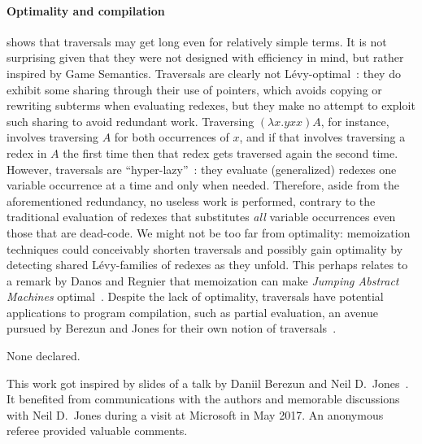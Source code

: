 \documentclass[xchauthor,chkrefs,GCNS,amsmath,amsthm,rotating,leaveRGB]{tcsg}
\theoremstyle{plain}
\theoremstyle{definition}
\begin{document}
\paragraph*{Optimality and compilation}
 shows that traversals may get long
even for relatively simple terms. It is not surprising given that they were
not designed with efficiency in mind, but rather inspired by Game Semantics.
Traversals are clearly not L\'{e}vy-optimal~\cite{optimal-reduction-levy}: they
do exhibit some sharing through their use of pointers, which avoids copying
or rewriting subterms when evaluating redexes, but they make no attempt to
exploit such sharing to avoid redundant work. Traversing $(\lambda x. y x x)
A$, for instance, involves traversing $A$ for both occurrences of $x$, and if
that involves traversing a redex in $A$ the first time then that redex gets
traversed again the second time. However, traversals are
``hyper-lazy''~\cite{danosherbelinregnier1996}: they evaluate (generalized)
redexes one variable occurrence at a time and only when needed. Therefore, aside from
the aforementioned  redundancy, no useless work is performed, contrary to
the traditional evaluation of redexes that substitutes \emph{all} variable
occurrences even those that are dead-code. We might not be too far from
optimality: memoization techniques could conceivably shorten traversals and
possibly gain optimality by detecting shared L\'{e}vy-families of redexes as
they unfold. This perhaps relates to a remark by Danos and Regnier that
memoization can make \emph{Jumping Abstract Machines}
optimal~\cite{DANOS199979}. Despite the lack of optimality, traversals have
potential applications to program compilation, such as partial evaluation, an
avenue pursued by Berezun and Jones for their own notion of
traversals~\cite{berezunjones_partialevalbytraversals}.






\begin{conflict}
None declared.
\end{conflict}





\begin{acks}
This work got inspired by slides of a talk by Daniil Berezun and Neil
D.~Jones~\cite{berezunjones_partialevalbytraversals}. It benefited from
communications with the authors and memorable discussions with Neil D.~Jones
during a visit at Microsoft in May 2017. An anonymous referee provided
valuable comments.
\end{acks}
\end{document}

